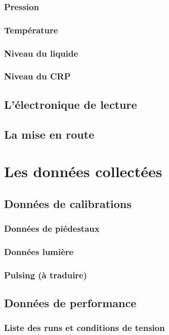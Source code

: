             \subsubsection{Pression}
            \subsubsection{Température}
            \subsubsection{Niveau du liquide}
            \subsubsection{Niveau du CRP}
        \subsection{L'électronique de lecture}
        \subsection{La mise en route}
        
    \section{Les données collectées}
        \subsection{Données de calibrations}
            \subsubsection{Données de piédestaux}
            \subsubsection{Données lumière}
            \subsubsection{Pulsing (à traduire)}
        \subsection{Données de performance}
            \subsubsection{Liste des runs et conditions de tension}
